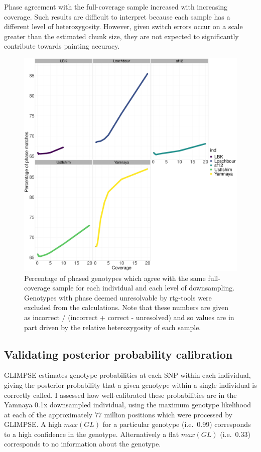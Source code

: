 {Phase agreement with the full-coverage sample increased with increasing coverage. Such results are difficult to interpret because each sample has a different level of heterozygosity. However, given switch errors occur on a scale greater than the estimated chunk size, they are not expected to significantly contribute towards painting accuracy.

\begin{figure}[htp]
    \centering
    \includegraphics[width=1.0\textwidth]{../images/chapter1/phasing_performance_downsampled.pdf}
    \caption{Percentage of phased genotypes which agree with the same full-coverage sample for each individual and each level of downsampling. Genotypes with phase deemed unresolvable by rtg-tools were excluded from the calculations. Note that these numbers are given as incorrect / (incorrect + correct - unresolved) and so values are in part driven by the relative heterozygosity of each sample.}
    \label{fig:phasing_performance_downsampled}
\end{figure}

\subsection{Validating posterior probability calibration}

GLIMPSE estimates genotype probabilities at each SNP within each individual, giving the posterior probability that a given genotype within a single individual is correctly called. I assessed how well-calibrated these probabilities are in the Yamnaya 0.1x downsampled individual, using the maximum genotype likelihood at each of the approximately 77 million positions which were processed by GLIMPSE. A high $max(GL)$ for a particular genotype (i.e.\ 0.99) corresponds to a high confidence in the genotype. Alternatively a flat $max(GL)$ (i.e.\ 0.33) corresponds to no information about the genotype. 

}
